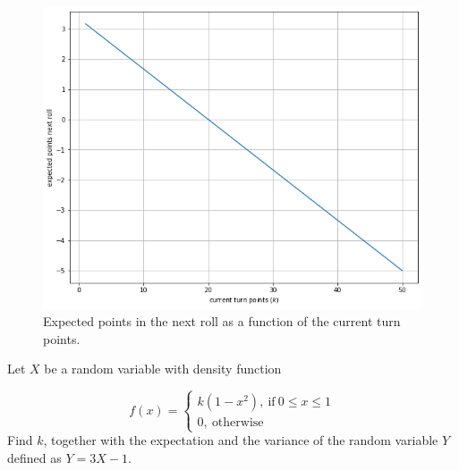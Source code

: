 \begin{solution}
\begin{figure}[htbp]
	\begin{center}
		\includegraphics[width=0.7\linewidth]{figures/greedy_pig_expectation}
	\end{center}
\caption{Expected points in the next roll as a function of the current turn points.}
\label{fig:greedy_pig_expec}
\end{figure}
\end{solution}

\begin{question}
Let $X$ be a random variable with density function

\begin{equation*}
	f(x) = 
	\begin{cases}
	k(1 - x^2),~\textrm{if}~0 \leq x \leq 1\\
	0,~\textrm{otherwise}		
	\end{cases}
\end{equation*}
Find $k$, together with the expectation and the variance of the random variable $Y$ defined as $Y = 3X - 1$.
\end{question}

